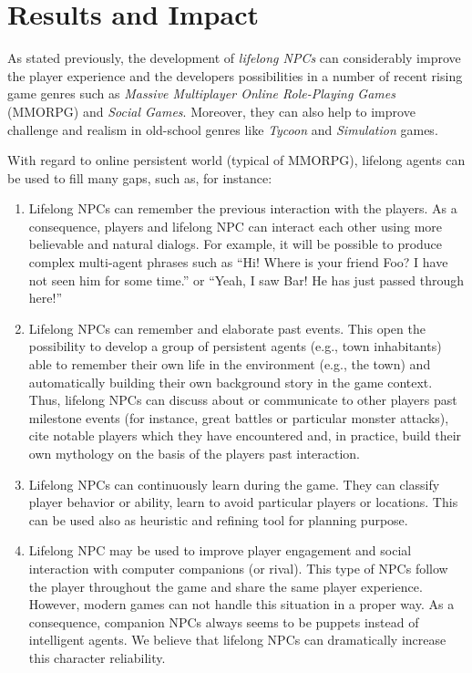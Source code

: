 \section{Results and Impact}

As stated previously, the development of \emph{lifelong NPCs} can considerably improve the player experience and the developers possibilities in a number of recent rising game genres such as \emph{Massive Multiplayer Online Role-Playing Games} (MMORPG) and \emph{Social Games}. Moreover, they can also help to improve challenge and realism in old-school genres like \emph{Tycoon} and \emph{Simulation} games.

With regard to online persistent world (typical of MMORPG), lifelong agents can be used to fill many gaps, such as, for instance:

\begin{enumerate}
\item Lifelong NPCs can remember the previous interaction with the players. As a consequence, players and lifelong NPC can interact each other using more believable and natural dialogs. For example, it will be possible to produce complex multi-agent phrases such as ``Hi! Where is your friend Foo? I have not seen him for some time.'' or  ``Yeah, I saw Bar! He has just passed through here!''
%
\item Lifelong NPCs can remember and elaborate past events. This open the possibility to develop a group of persistent agents (e.g., town inhabitants) able to remember their own life in the environment (e.g., the town) and automatically building their own background story in the game context. Thus, lifelong NPCs can discuss about or communicate to other players past milestone events (for instance, great battles or particular monster attacks), cite notable players which they have encountered and, in practice, build their own mythology on the basis of the players past interaction.
%
\item Lifelong NPCs can continuously learn during the game. They can classify player behavior or ability, learn to avoid particular players or locations. This can be used also as heuristic and refining tool for planning purpose.
%
\item Lifelong NPC may be used to improve player engagement and social interaction with computer companions (or rival). This type of NPCs follow the player throughout the game and share the same player experience. However, modern games can not handle this situation in a proper way. As a consequence, companion NPCs always seems to be puppets instead of intelligent agents. We believe that lifelong NPCs can dramatically increase this character reliability.
\end{enumerate}

